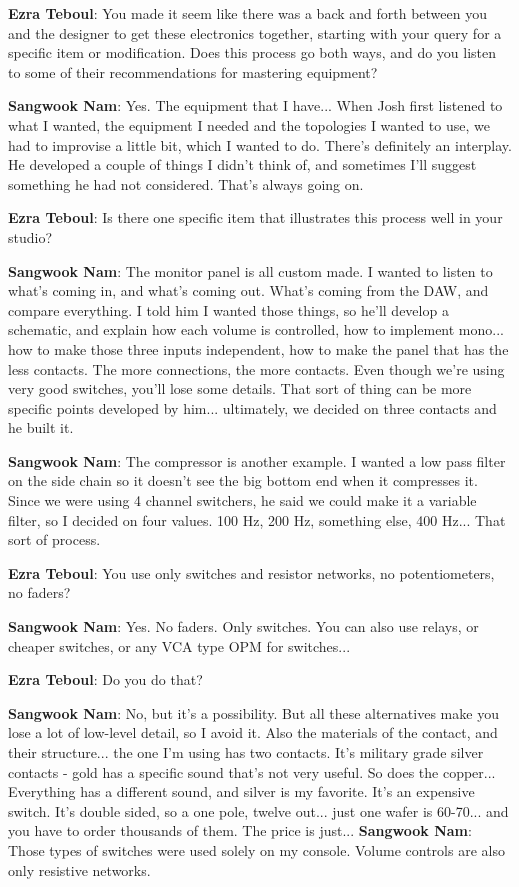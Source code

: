\textbf{Ezra Teboul}: You made it seem like there was a back and forth between you and the designer to get these electronics together, starting with your query for a specific item or modification. Does this process go both ways, and do you listen to some of their recommendations for mastering equipment?

\textbf{Sangwook Nam}: Yes. The equipment that I have... When Josh first listened to what I wanted, the equipment I needed and the topologies I wanted to use, we had to improvise a little bit, which I wanted to do. There's definitely an interplay. He developed a couple of things I didn't think of, and sometimes I'll suggest something he had not considered. That's always going on.

\textbf{Ezra Teboul}: Is there one specific item that illustrates this process well in your studio?

\textbf{Sangwook Nam}: The monitor panel is all custom made. I wanted to listen to what's coming in, and what's coming out. What's coming from the DAW, and compare everything. I told him I wanted those things, so he'll develop a schematic, and explain how each volume is controlled, how to implement mono... how to make those three inputs independent, how to make the panel that has the less contacts. The more connections, the more contacts. Even though we're using very good switches, you'll lose some details. That sort of thing can be more specific points developed by him... ultimately, we decided on three contacts and he built it.

\textbf{Sangwook Nam}: The compressor is another example. I wanted a low pass filter on the side chain so it doesn't see the big bottom end when it compresses it. Since we were using 4 channel switchers, he said we could make it a variable filter, so I decided on four values. 100 Hz, 200 Hz, something else, 400 Hz... That sort of process.

\textbf{Ezra Teboul}: You use only switches and resistor networks, no potentiometers, no faders?

\textbf{Sangwook Nam}: Yes. No faders. Only switches. You can also use relays, or cheaper switches, or any VCA type OPM for switches...

\textbf{Ezra Teboul}: Do you do that?

\textbf{Sangwook Nam}: No, but it's a possibility. But all these alternatives make you lose a lot of low-level detail, so I avoid it. Also the materials of the contact, and their structure... the one I'm using has two contacts. It's military grade silver contacts - gold has a specific sound that's not very useful. So does the copper... Everything has a different sound, and silver is my favorite. It's an expensive switch. It's double sided, so a one pole, twelve out... just one wafer is 60-70... and you have to order thousands of them. The price is just...
\textbf{Sangwook Nam}: Those types of switches were used solely on my console. Volume controls are also only resistive networks.

